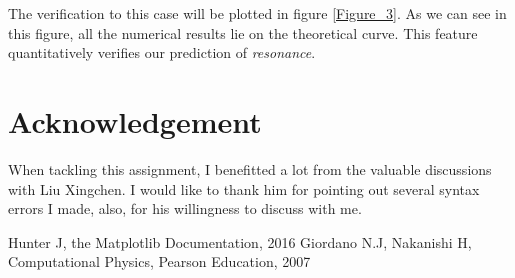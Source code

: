 \documentclass[10pt,a4paper]{article}
\begin{document}
     The verification to this case will be plotted in figure \ref{Figure_3}.
    As we can see in this figure, all the numerical results lie on the theoretical curve. This feature quantitatively verifies our prediction of \emph{resonance}.
    
    \section*{Acknowledgement}
    When tackling this assignment, I benefitted a lot from the valuable discussions with Liu Xingchen. I would like to thank him for pointing out several syntax errors I made, also, for his willingness to discuss with me.
    
    \begin{thebibliography}{99}
    	\bibitem{}Hunter J, the Matplotlib Documentation, 2016
    	\bibitem{}Giordano N.J, Nakanishi H, Computational Physics, Pearson Education, 2007
    \end{thebibliography} 
\end{document}
